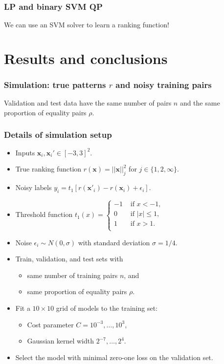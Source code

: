 \documentclass{beamer}
\begin{document}
\begin{frame}
  \frametitle{LP and binary SVM QP}
  \begin{minipage}{1.0\linewidth}
    \hskip -1cm
      
  \end{minipage}
  We can use an SVM solver to learn a ranking function!
\end{frame}

\section{Results and conclusions}

\begin{frame}
  \frametitle{Simulation: true patterns $r$ and noisy training pairs}
  \begin{minipage}{1.0\linewidth}
    \hskip -0.5cm  Validation and test data
    have the same number of pairs $n$ and the same proportion of
    equality pairs $\rho$.
  \end{minipage}
\end{frame}

\begin{frame}
  \frametitle{Details of simulation setup}
  \begin{itemize}
    \item Inputs $\mathbf x_i,\mathbf x_i'\in[-3,3]^2$.
    \item True ranking function $r(\mathbf x)=||\mathbf x||^2_j$ 
      for $j\in\{1,2,\infty\}$.
    \item Noisy labels $y_i=t_1[r(\mathbf x'_i)-r(\mathbf x_i)+\epsilon_i]$.
  \item Threshold function
$
  \label{eq:threshold}
  t_1(x) = 
  \begin{cases}
    -1 & \text{ if } x < -1, \\
    0 & \text{ if } |x| \leq 1, \\
    1 & \text{ if } x > 1. \\
  \end{cases}
$
\item Noise $\epsilon_i\sim N(0, \sigma)$ with standard deviation
  $\sigma=1/4$.
\item Train, validation, and test sets with
  \begin{itemize}
    \item same number of training pairs $n$, and
    \item same proportion of equality pairs $\rho$.
  \end{itemize}
\item Fit a $10\times 10$ grid of models to the training
set:
\begin{itemize}
\item Cost parameter $C=10^{-3},\dots,10^3$,
\item Gaussian kernel width $2^{-7},\dots,2^4$.
\end{itemize}
\item Select the model with minimal zero-one loss on the validation set.
  \end{itemize}
\end{frame}
\end{document}
